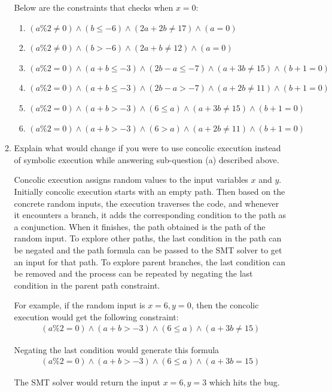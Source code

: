 \documentclass[12pt,a4paper]{article}
\begin{document}
\begin{enumerate}
\begin{enumerate}
Below are the constraints that checks when $x = 0$: 

\begin{enumerate}
\item $(a\%2 \neq 0) \wedge (b \leq -6) \wedge (2a + 2b \neq 17) \wedge (a = 0)$ 
\item $(a\%2 \neq 0) \wedge (b > -6) \wedge (2a + b \neq 12) \wedge (a = 0)$
\item $(a\%2 = 0) \wedge (a + b \leq -3) \wedge (2b - a \leq -7) \wedge (a + 3b \neq 15) \wedge (b + 1 = 0)$
\item $(a\%2 = 0) \wedge (a + b \leq -3) \wedge (2b - a > -7) \wedge (a + 2b \neq 11)\wedge (b + 1 = 0)$
\item $(a\%2 = 0) \wedge (a + b > -3) \wedge (6 \leq a) \wedge (a + 3b \neq 15) \wedge (b + 1 = 0)$
\item $(a\%2 = 0) \wedge (a + b > -3) \wedge (6 > a) \wedge (a + 2b \neq 11) \wedge (b + 1 = 0)$


\end{enumerate}


\color{black}

\item Explain what would change if you were to use concolic execution instead of symbolic execution
while answering sub-question (a) described above.

\color{blue}
Concolic execution assigns random values to the input variables $x$ and $y$. Initially concolic execution starts with an empty path. Then based on the concrete random inputs, the execution traverses the code, and whenever it encounters a branch, it adds the corresponding condition to the path as a conjunction. When it finishes, the path obtained is the path of the random input. To explore other paths, the last condition in the path can be negated and the path formula can be passed to the SMT solver to get an input for that path. 
To explore parent branches, the last condition can be removed and the process can be repeated by negating the last condition in the parent path constraint. 

For example, if the random input is $x = 6, y = 0$, then the concolic execution would get the following constraint:
\begin{align*}
(a\%2 = 0) \wedge (a + b > -3) \wedge (6 \leq a) \wedge (a + 3b \neq 15)
\end{align*}

Negating the last condition would generate this formula
\begin{align*}
(a\%2 = 0) \wedge (a + b > -3) \wedge (6 \leq a) \wedge (a + 3b = 15)
\end{align*}

The SMT solver would return the input $x = 6, y = 3$ which hits the bug. 

\color{black}

\end{enumerate}
\end{enumerate}
\end{document}
